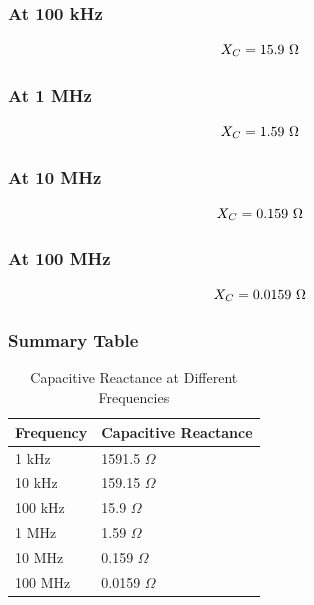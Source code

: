 \documentclass[12pt,a4paper]{report}
\begin{document}
	\subsubsection*{At 100 kHz}
	\begingroup
	\setlength{\mathindent}{0pt}
	\begin{equation*}
		\hfill
		X_C = 15.9\ \Omega
		\hfill
	\end{equation*}
	\endgroup
	
	\subsubsection*{At 1 MHz}
	\begingroup
	\setlength{\mathindent}{0pt}
	\begin{equation*}
		\hfill
		X_C = 1.59\ \Omega
		\hfill
	\end{equation*}
	\endgroup
	
	\subsubsection*{At 10 MHz}
	\begingroup
	\setlength{\mathindent}{0pt}
	\begin{equation*}
		\hfill
		X_C = 0.159\ \Omega
		\hfill
	\end{equation*}
	\endgroup
	
	\subsubsection*{At 100 MHz}
	\begingroup
	\setlength{\mathindent}{0pt}
	\begin{equation*}
		\hfill
		X_C = 0.0159\ \Omega
		\hfill
	\end{equation*}
	\endgroup
	
	\subsubsection*{Summary Table}
	
	\begin{table}[htbp]
		\centering
		\caption{Capacitive Reactance at Different Frequencies}
		\label{tab:reactance}
		\begin{tabular}{p{5cm} p{5cm}}
			\toprule
			\textbf{Frequency} & \textbf{Capacitive Reactance} \\
			\midrule
			1 kHz & 1591.5 $\Omega$ \\
			10 kHz & 159.15 $\Omega$ \\
			100 kHz & 15.9 $\Omega$ \\
			1 MHz & 1.59 $\Omega$ \\
			10 MHz & 0.159 $\Omega$ \\
			100 MHz & 0.0159 $\Omega$ \\
			\bottomrule
		\end{tabular}
	\end{table}
	
\end{document}
